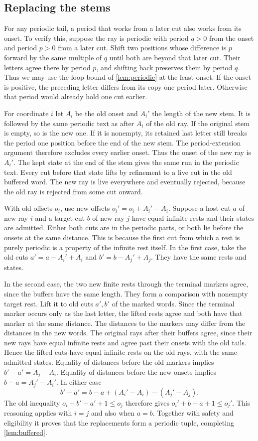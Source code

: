 \subsection{Replacing the stems}

For any periodic tail, a period that works from a later cut
also works from its onset. To verify this, suppose the ray is
periodic with period $q>0$ from the onset and period $p>0$ from
a later cut. Shift two positions whose difference is $p$ forward
by the same multiple of $q$ until both are beyond that later cut.
Their letters agree there by period $p$, and shifting back
preserves them by period $q$. Thus we may use the loop bound
of \cref{lem:periodic} at the least onset. If the onset is positive,
the preceding letter differs from its copy one period later.
Otherwise that period would already hold one cut earlier.

For coordinate $i$ let $A_i$ be the old onset and $A_i'$ the
length of the new stem. It is followed by the same periodic text
as after $A_i$ of the old ray. If the original stem is empty,
so is the new one. If it is nonempty, its retained last letter
still breaks the period one position before the end of the new
stem. The period-extension argument therefore excludes every
earlier onset. Thus the onset of the new ray is $A_i'$.
The kept state at the end of the stem gives the same run in
the periodic text. Every cut before that state lifts by
refinement to a live cut in the old buffered word. The new
ray is live everywhere and eventually rejected, because the old
ray is rejected from some cut onward.

With old offsets $o_i$, use new offsets $o_i'=o_i+A_i'-A_i$.
Suppose a host cut $a$ of new ray $i$ and a target cut $b$ of
new ray $j$ have equal infinite rests and their states are admitted.
Either both cuts are in the periodic parts, or both lie before
the onsets at the same distance. This is because the first cut
from which a rest is purely periodic is a property of the
infinite rest itself. In the first case, take the old cuts
$a'=a-A_i'+A_i$ and $b'=b-A_j'+A_j$. They have the same rests
and states.

In the second case, the two new finite rests through the terminal
markers agree, since the buffers have the same length.
They form a comparison with nonempty target rest. Lift it to old cuts
$a',b'$ of the marked words. Since the terminal marker occurs
only as the last letter, the lifted rests agree and both have that
marker at the same distance. The distances to the markers
may differ from the distances in the new words. The original
rays after their buffers agree, since their new rays have equal
infinite rests and agree past their onsets with the old tails.
Hence the lifted cuts have equal infinite rests on the old
rays, with the same admitted states. Equality of distances
before the old markers implies $b'-a'=A_j-A_i$.
Equality of distances before the new onsets implies
$b-a=A_j'-A_i'$. In either case
\[
   b'-a' = b-a + (A_i'-A_i)-(A_j'-A_j).
\]
The old inequality $o_i+b'-a'+1\le o_j$ therefore gives
$o_i'+b-a+1\le o_j'$. This reasoning applies with $i=j$ and
also when $a=b$. Together with safety and eligibility it proves
that the replacements form a periodic tuple, completing
\cref{lem:buffered}.

